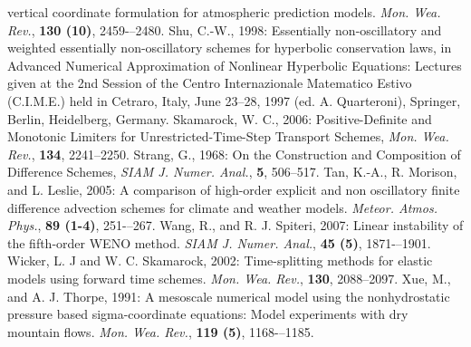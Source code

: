 vertical coordinate formulation for atmospheric prediction models. {\it Mon. Wea. Rev.}, {\bf
130 (10)}, 2459-–2480.
\decrefname
Shu, C.-W., 1998: Essentially non-oscillatory and weighted essentially non-oscillatory schemes
for hyperbolic conservation laws, in Advanced Numerical Approximation of Nonlinear Hyperbolic Equations: Lectures given at the 2nd Session of the Centro Internazionale Matematico Estivo (C.I.M.E.) held in Cetraro, Italy, June 23--28, 1997 (ed. A. Quarteroni), Springer, Berlin, Heidelberg, Germany.
\decrefname
Skamarock, W. C., 2006: Positive-Definite and Monotonic Limiters for
   Unrestricted-Time-Step Transport Schemes,
   {\it Mon. Wea. Rev.}, {\bf 134}, 2241--2250.
\decrefname
Strang, G., 1968: On the Construction and Composition of Difference Schemes, 
   {\it SIAM J. Numer. Anal.}, {\bf 5}, 506--517.
\decrefname
Tan, K.-A., R. Morison, and L. Leslie, 2005: A comparison of high-order explicit and non
oscillatory finite difference advection schemes for climate and weather models. {\it Meteor.
 Atmos. Phys.}, {\bf 89 (1-4)}, 251-–267.
\decrefname
Wang, R., and R. J. Spiteri, 2007: Linear instability of the fifth-order WENO method. {\it SIAM J. Numer. Anal.}, {\bf 45 (5)}, 1871-–1901.
\decrefname
Wicker, L. J and W. C. Skamarock, 2002: Time-splitting methods for elastic models using forward time schemes. {\it Mon. Wea. Rev.},  {\bf 130}, 2088--2097.
\decrefname
Xue, M., and A. J. Thorpe, 1991: A mesoscale numerical model using the nonhydrostatic pressure
based sigma-coordinate equations: Model experiments with dry mountain flows. {\it Mon. Wea. Rev.},  {\bf 119 (5)}, 1168-–1185.
